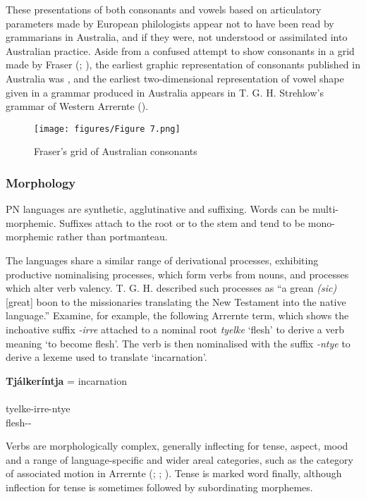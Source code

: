 These presentations of both consonants and vowels based on articulatory parameters made by European philologists appear not to have been read by grammarians in Australia, and if they were, not understood or assimilated into Australian practice. Aside from a confused attempt to show consonants in a grid made by Fraser (\citeyear[8]{fraser_introduction_1892}; ), the earliest graphic representation of consonants published in Australia was \citet[8]{capell_new_1956}, and the earliest two-dimension\-al representation of vowel shape given in a grammar produced in Australia appears in T. G. H. Strehlow’s grammar of Western Arrernte (\citeyear[4]{strehlow_aranda_1944}).

\begin{figure}
\texttt{[image: figures/Figure 7.png]}
\caption{Fraser's grid of Australian consonants \citeyearpar[8]{fraser_introduction_1892}}
\label{fig:key:Fraser}
\end{figure}

\subsubsection{Morphology}
\label{sec:key:1.2.1.2}

PN languages are synthetic, agglutinative and suffixing. Words can be multi-morphemic. Suffixes attach to the root or to the stem and tend to be mono-morphemic rather than portmanteau. 

The languages share a similar range of derivational processes, exhibiting productive nominalising processes, which form verbs from nouns, and processes which alter verb valency. T. G. H. \citet[62]{strehlow_aranda_1944} described such processes as “a grean \textit{(sic)} [great] boon to the missionaries translating the New Testament into the native language.” Examine, for example, the following Arrernte term, which shows the inchoative suffix \textit{-irre} attached to a nominal root \textit{tyelke} `flesh' to derive a verb meaning `to become flesh'. The verb is then nominalised with the suffix \textit{-ntye} to derive a lexeme used to translate `incarnation'.

\ea
\textbf{Tjálkeríntja} = incarnation \\
\glt \citep[62]{strehlow_aranda_1944} \\
\gll tyelke-irre-ntye \\
flesh-- \\
\z

\hspace*{-2.5pt}Verbs are morphologically complex, generally inflecting for tense, aspect, mood and a range of language-specific and wider areal categories, such as the category of associated motion in Arrernte (\citealt[270]{wilkins_mparntwe_1989}; \citealt[23]{koch_category_1984}; ). Tense is marked word finally, although inflection for tense is sometimes followed by subordinating morphemes.

